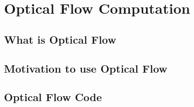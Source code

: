 \chapter{Optical Flow Computation}

\section{What is Optical Flow}

\section{Motivation to use Optical Flow}

\section{Optical Flow Code}


